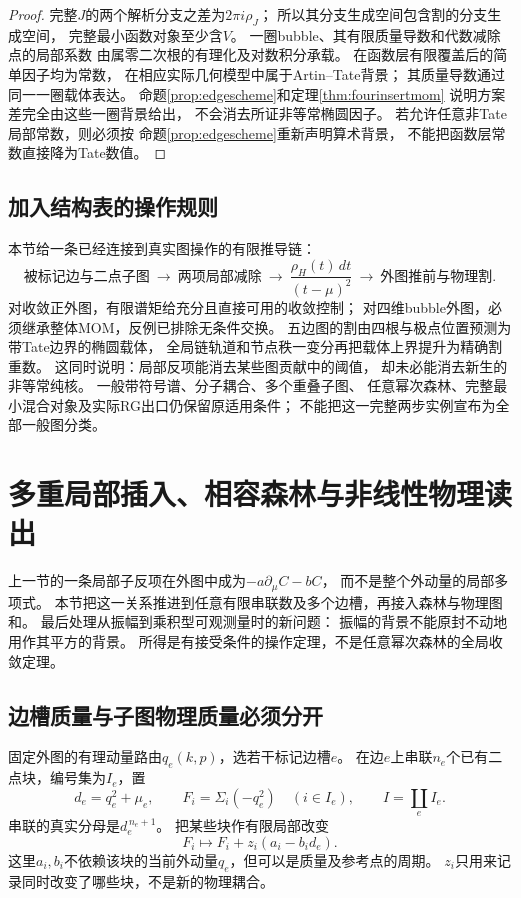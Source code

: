 \documentclass[11pt,a4paper]{ctexart}
\theoremstyle{cnplain}\newtheorem{theorem}{定理}[section]
\theoremstyle{definition}\newtheorem{definition}[theorem]{定义}
\theoremstyle{remark}\newtheorem{remark}[theorem]{注}
\begin{document}
\begin{proof}
完整$J$的两个解析分支之差为$2\pi i\rho_J$；
所以其分支生成空间包含割的分支生成空间，
完整最小函数对象至少含$V$。
一圈bubble、其有限质量导数和代数减除点的局部系数
由属零二次根的有理化及对数积分承载。
在函数层有限覆盖后的简单因子均为常数，
在相应实际几何模型中属于Artin--Tate背景；
其质量导数通过同一一圈载体表达。
命题\ref{prop:edgescheme}和定理\ref{thm:fourinsertmom}
说明方案差完全由这些一圈背景给出，
不会消去所证非等常椭圆因子。
若允许任意非Tate局部常数，则必须按
命题\ref{prop:edgescheme}重新声明算术背景，
不能把函数层常数直接降为Tate数值。
\end{proof}

\subsection{加入结构表的操作规则}
本节给一条已经连接到真实图操作的有限推导链：
\[
 \text{被标记边与二点子图}
 \ \longrightarrow\ \text{两项局部减除}
 \ \longrightarrow\ \frac{\rho_H(t)\,dt}{(t-\mu)^2}
 \ \longrightarrow\ \text{外图推前与物理割}.
\]
对收敛正外图，有限谱矩给充分且直接可用的收敛控制；
对四维bubble外图，必须继承整体MOM，反例已排除无条件交换。
五边图的割由四根与极点位置预测为带Tate边界的椭圆载体，
全局链轨道和节点秩一变分再把载体上界提升为精确割重数。
这同时说明：局部反项能消去某些图贡献中的阈值，
却未必能消去新生的非等常纯核。
一般带符号谱、分子耦合、多个重叠子图、
任意幂次森林、完整最小混合对象及实际RG出口仍保留原适用条件；
不能把这一完整两步实例宣布为全部一般图分类。


\section{多重局部插入、相容森林与非线性物理读出}
\label{sec:forestobservable}

上一节的一条局部子反项在外图中成为$-a\partial_\mu C-bC$，
而不是整个外动量的局部多项式。
本节把这一关系推进到任意有限串联数及多个边槽，再接入森林与物理图和。
最后处理从振幅到乘积型可观测量时的新问题：
振幅的背景不能原封不动地用作其平方的背景。
所得是有接受条件的操作定理，不是任意幂次森林的全局收敛定理。

\subsection{边槽质量与子图物理质量必须分开}

固定外图的有理动量路由$q_e(k,p)$，选若干标记边槽$e$。
在边$e$上串联$n_e$个已有二点块，编号集为$I_e$，置
\[
 d_e=q_e^2+\mu_e,\qquad
 F_i=\Sigma_i(-q_e^2)\quad(i\in I_e),\qquad I=\coprod_e I_e.
\]
串联的真实分母是$d_e^{\,n_e+1}$。
把某些块作有限局部改变
\begin{equation}\label{eq:multijetlocal}
 F_i\longmapsto F_i+z_i(a_i-b_i d_e).
\end{equation}
这里$a_i,b_i$不依赖该块的当前外动量$q_e$，但可以是质量及参考点的周期。
$z_i$只用来记录同时改变了哪些块，不是新的物理耦合。
\end{document}
